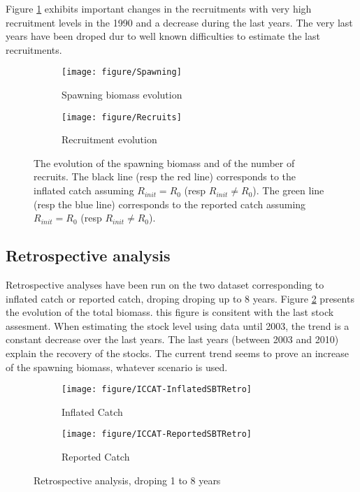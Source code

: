 Figure \ref{fig:recruits} exhibits important changes in the recruitments with very high recruitment levels in the 1990 and a decrease during the last years. The very last years have been droped dur to well known difficulties to estimate the last recruitments.

\begin{figure}
 \begin{subfigure}[b]{0.45\textwidth}
  \texttt{[image: figure/Spawning]} 
  \caption{Spawning biomass evolution}
  \end{subfigure}\hfill
 \begin{subfigure}[b]{0.45\textwidth}
  \texttt{[image: figure/Recruits]} 
	\caption{Recruitment evolution}
  \end{subfigure}
\caption{The evolution of the spawning biomass and of the number of recruits.
The black line (resp the red line) corresponds to the inflated catch assuming $R_{init}=R_0$ (resp $R_{init}\ne R_0$).   
The green line (resp the blue line) corresponds to the reported catch assuming $R_{init}=R_0$ (resp $R_{init}\ne R_0$). }
\label{fig:recruits}
\end{figure}




\subsection{Retrospective analysis}
Retrospective analyses have been run on the two dataset corresponding to inflated catch or reported catch, droping 
 droping up to 8 years. Figure \ref{fig:RetroAnalysis}
 presents the evolution of the total biomass. this figure is consitent with the last stock assesment.
 When estimating the stock level using data until 2003, the trend is a constant decrease over the last years. 
 The last years (between 2003 and 2010) explain the recovery of the stocks. 
 The current trend seems to prove an increase of the spawning biomass, whatever scenario is used.

\begin{figure}[htbp]
 \begin{subfigure}[b]{\textwidth}
  \texttt{[image: figure/ICCAT-InflatedSBTRetro]} 
  \caption{Inflated Catch}
  \end{subfigure}
 \begin{subfigure}[b]{\textwidth}
  \texttt{[image: figure/ICCAT-ReportedSBTRetro]} 
	\caption{Reported Catch}
  \end{subfigure}
\caption{Retrospective analysis, droping 1 to 8 years}
\label{fig:RetroAnalysis}
\end{figure}



